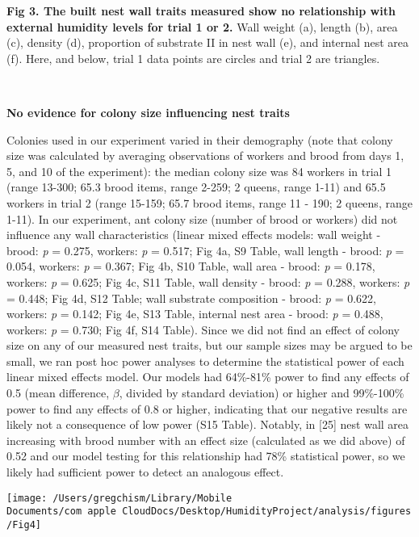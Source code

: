 \documentclass[3p]{elsarticle} %
\begin{document}
\textbf{Fig 3. The built nest wall traits measured show no relationship
with external humidity levels for trial 1 or 2.} Wall weight (a), length
(b), area (c), density (d), proportion of substrate II in nest wall (e),
and internal nest area (f). Here, and below, trial 1 data points are
circles and trial 2 are triangles.

~

\textbf{No evidence for colony size influencing nest traits}

Colonies used in our experiment varied in their demography (note that
colony size was calculated by averaging observations of workers and
brood from days 1, 5, and 10 of the experiment): the median colony size
was 84 workers in trial 1 (range 13-300; 65.3 brood items, range 2-259;
2 queens, range 1-11) and 65.5 workers in trial 2 (range 15-159; 65.7
brood items, range 11 - 190; 2 queens, range 1-11). In our experiment,
ant colony size (number of brood or workers) did not influence any wall
characteristics (linear mixed effects models: wall weight - brood:
\emph{p} = 0.275, workers: \emph{p} = 0.517; Fig 4a, S9 Table, wall
length - brood: \emph{p} = 0.054, workers: \emph{p} = 0.367; Fig 4b, S10
Table, wall area - brood: \emph{p} = 0.178, workers: \emph{p} = 0.625;
Fig 4c, S11 Table, wall density - brood: \emph{p} = 0.288, workers:
\emph{p} = 0.448; Fig 4d, S12 Table; wall substrate composition - brood:
\emph{p} = 0.622, workers: \emph{p} = 0.142; Fig 4e, S13 Table, internal
nest area - brood: \emph{p} = 0.488, workers: \emph{p} = 0.730; Fig 4f,
S14 Table). Since we did not find an effect of colony size on any of our
measured nest traits, but our sample sizes may be argued to be small, we
ran post hoc power analyses to determine the statistical power of each
linear mixed effects model. Our models had 64\%-81\% power to find any
effects of 0.5 (mean difference, \(\beta\), divided by standard
deviation) or higher and 99\%-100\% power to find any effects of 0.8 or
higher, indicating that our negative results are likely not a
consequence of low power (S15 Table). Notably, in {[}25{]} nest wall
area increasing with brood number with an effect size (calculated as we
did above) of 0.52 and our model testing for this relationship had 78\%
statistical power, so we likely had sufficient power to detect an
analogous effect.

\begin{flushleft}\texttt{[image: /Users/gregchism/Library/Mobile Documents/com~apple~CloudDocs/Desktop/HumidityProject/analysis/figures/Fig4]} \end{flushleft}
\end{document}
